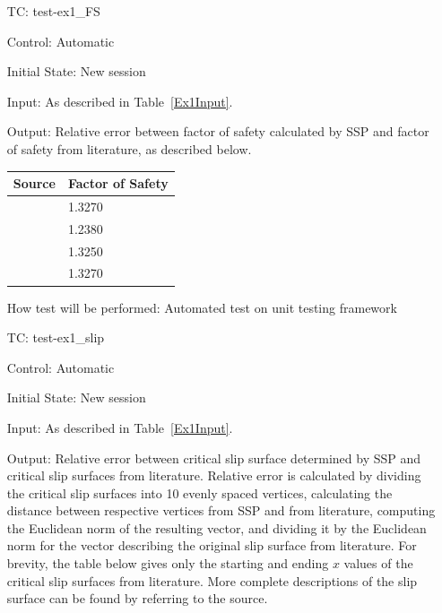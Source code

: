 \documentclass[12pt, titlepage]{article}
\newcounter{testnum} %
\newcommand{\progname}{SSP}
\begin{document}
\begin{enumerate}[label=TC\arabic*:,ref={\arabic*}]
	
\item [TC\refstepcounter{testnum}\thetestnum: \label{TC_Ex1FS}] test-ex1\_FS

Control: Automatic

Initial State: New session

Input: As described in Table~\ref{Ex1Input}.

Output: Relative error between factor of safety calculated by \progname{} and 
factor of safety from literature, as described below. \newline
\begin{tabularx}{1.0\textwidth}{p{7cm} l}
	\toprule \textbf{Source} & \textbf{Factor of Safety}\\ \midrule
	\cite{Greco1996} & 1.3270\\
	\cite{MalkawiEtAl} & 1.2380\\
	\cite{ChengEtAl} & 1.3250\\
	\cite{LiEtAl} & 1.3270\\
	\bottomrule
\end{tabularx}

How test will be performed: Automated test on unit testing framework

\item [TC\refstepcounter{testnum}\thetestnum: \label{TC_Ex1Slip}] test-ex1\_slip

Control: Automatic

Initial State: New session

Input: As described in Table~\ref{Ex1Input}.

Output: Relative error between critical slip surface determined by \progname{} 
and critical slip surfaces from literature. Relative error is calculated 
by dividing the critical slip surfaces into 10 evenly spaced vertices, 
calculating the distance between respective vertices from \progname{} and from 
literature, computing the Euclidean norm of the resulting vector, and dividing 
it by the Euclidean norm for the vector describing the original slip surface 
from literature. For brevity, the table below gives only the starting and 
ending $x$ values of the critical slip surfaces from literature. More complete 
descriptions of the slip surface can be found by referring to the source. 



\end{enumerate}
\end{document}
